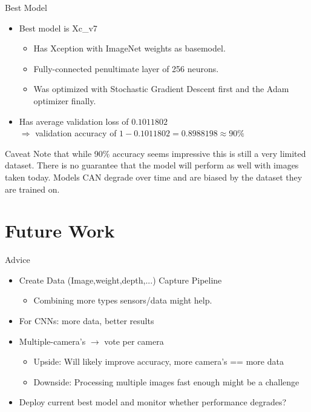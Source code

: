 \documentclass{beamer}
\begin{document}
\begin{frame}{Best Model}
\begin{itemize}
 \item Best model is Xc\_v7
  \begin{itemize}
    \item Has Xception with ImageNet weights as basemodel.
    \item Fully-connected penultimate layer of 256 neurons.
    \item Was optimized with Stochastic Gradient Descent first and the Adam optimizer finally. 
  \end{itemize}
 \item Has average validation loss of $0.1011802$ \\ $\Rightarrow$ validation accuracy of $ 1 - 0.1011802 = 0.8988198 \approx 90\%$
\end{itemize}
\end{frame}

\begin{frame}{Caveat}
Note that while 90\% accuracy seems impressive this is still a very limited dataset.
There is no guarantee that the model will perform as well with images taken today.
Models CAN degrade over time and are biased by the dataset they are trained on.
\end{frame}

\section{Future Work}
\begin{frame}{Advice}
\begin{itemize}
  \item Create Data (Image,weight,depth,...) Capture Pipeline
  \begin{itemize}
  \item Combining more types sensors/data might help.
  \end{itemize}
  \item For CNNs: more data, better results
  \item Multiple-camera's $\rightarrow$ vote per camera
  \begin{itemize}
  \item Upside: Will likely improve accuracy, more camera's == more data
  \item Downside: Processing multiple images fast enough might be a challenge 
  \end{itemize}
  \item Deploy current best model and monitor whether performance degrades?
\end{itemize}
\end{frame}{}
\end{document}
